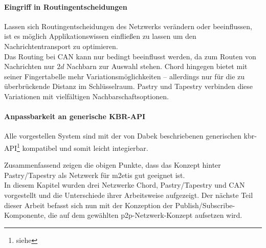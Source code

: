 \paragraph{Eingriff in Routingentscheidungen} Lassen sich Routingentscheidungen des Netzwerks verändern oder beeinflussen, ist es möglich Applikationswissen einfließen zu lassen um den Nachrichtentransport zu optimieren.\\
Das Routing bei CAN kann nur bedingt beeinflusst werden, da zum Routen von Nachrichten nur $2d$ Nachbarn zur Auswahl stehen. Chord hingegen bietet mit seiner Fingertabelle mehr Variations\-möglichkeiten -- allerdings nur für die zu überbrückende Distanz im Schlüsselraum. Pastry und Tapes\-try verbinden diese Variationen mit vielfältigen Nachbarschaftsoptionen.

\paragraph{Anpassbarkeit an generische KBR-API}
Alle vorgestellen System sind mit der von Dabek beschriebenen generischen \ac{kbr}-API\footnote{siehe } kompatibel und somit leicht integierbar.

Zusammenfassend zeigen die obigen Punkte, dass das Konzept hinter Pastry/Tapestry als Netzwerk für \ac{m2etis} gut geeignet ist.\\
In diesem Kapitel wurden drei Netzwerke Chord, Pastry/Tapestry und CAN vorgestellt und die Unterschiede ihrer Arbeitsweise aufgezeigt. Der nächste Teil dieser Arbeit befasst sich nun mit der Konzeption der Publish/Subscribe-Komponente, die auf dem gewählten p2p-Netzwerk-Konzept aufsetzen wird.

